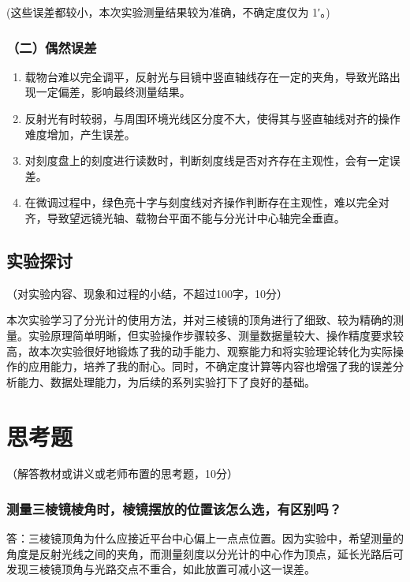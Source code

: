 \documentclass[10pt,a4paper]{ctexart}
\newcommand{\myspace}[1]{\par\vspace{#1\baselineskip}} %
\newcommand{\xiaosi}{\fontsize{12pt}{16pt}\selectfont}
\begin{document}
    (这些误差都较小，本次实验测量结果较为准确，不确定度仅为 1′。)
    
    \subsubsection*{（二）偶然误差}

    \begin{enumerate}
        \item 载物台难以完全调平，反射光与目镜中竖直轴线存在一定的夹角，导致光路出现一定偏差，影响最终测量结果。
        \item 反射光有时较弱，与周围环境光线区分度不大，使得其与竖直轴线对齐的操作难度增加，产生误差。
        \item 对刻度盘上的刻度进行读数时，判断刻度线是否对齐存在主观性，会有一定误差。
        \item 在微调过程中，绿色亮十字与刻度线对齐操作判断存在主观性，难以完全对齐，导致望远镜光轴、载物台平面不能与分光计中心轴完全垂直。
    \end{enumerate}
    
    
    \subsection{实验探讨}
    \xiaosi （对实验内容、现象和过程的小结，不超过100字，10分）

    \myspace{1}

本次实验学习了分光计的使用方法，并对三棱镜的顶角进行了细致、较为精确的测量。实验原理简单明晰，但实验操作步骤较多、测量数据量较大、操作精度要求较高，故本次实验很好地锻炼了我的动手能力、观察能力和将实验理论转化为实际操作的应用能力，培养了我的耐心。同时，不确定度计算等内容也增强了我的误差分析能力、数据处理能力，为后续的系列实验打下了良好的基础。
\section{思考题}

    \xiaosi （解答教材或讲义或老师布置的思考题，10分）

    \subsubsection*{测量三棱镜棱角时，棱镜摆放的位置该怎么选，有区别吗？}

    答：三棱镜顶角为什么应接近平台中心偏上一点点位置。因为实验中，希望测量的角度是反射光线之间的夹角，而测量刻度以分光计的中心作为顶点，延长光路后可发现三棱镜顶角与光路交点不重合，如此放置可减小这一误差。
        
\end{document}
